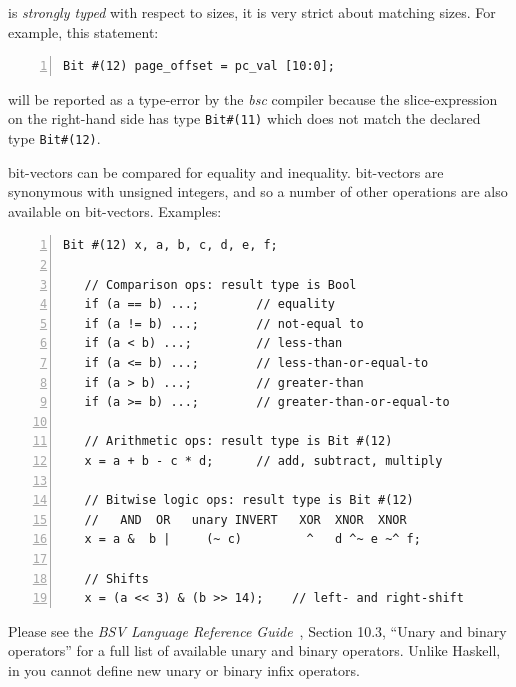 {\BSV} is \emph{strongly typed} with respect to sizes, {\ie} it is very
strict about matching sizes.  For example, this statement:

{\footnotesize
\begin{Verbatim}[frame=single, numbers=left]
   Bit #(12) page_offset = pc_val [10:0];
\end{Verbatim}
}

will be reported as a type-error by the \emph{bsc} compiler because
the slice-expression on the right-hand side has type \verb|Bit#(11)|
which does not match the declared type \verb|Bit#(12)|.




{\BSV} bit-vectors can be compared for equality and inequality.  {\BSV}
bit-vectors are synonymous with unsigned integers, and so a number of
other operations are also available on bit-vectors.  Examples:


{\footnotesize
\begin{Verbatim}[frame=single, numbers=left]
   Bit #(12) x, a, b, c, d, e, f;

   // Comparison ops: result type is Bool
   if (a == b) ...;        // equality
   if (a != b) ...;        // not-equal to
   if (a < b) ...;         // less-than
   if (a <= b) ...;        // less-than-or-equal-to
   if (a > b) ...;         // greater-than
   if (a >= b) ...;        // greater-than-or-equal-to

   // Arithmetic ops: result type is Bit #(12)
   x = a + b - c * d;      // add, subtract, multiply

   // Bitwise logic ops: result type is Bit #(12)
   //   AND  OR   unary INVERT   XOR  XNOR  XNOR
   x = a &  b |     (~ c)         ^   d ^~ e ~^ f;

   // Shifts
   x = (a << 3) & (b >> 14);    // left- and right-shift
\end{Verbatim}
}

Please see the \emph{BSV Language Reference Guide}~\cite{BLang2000},
Section 10.3, ``Unary and binary operators'' for a full list of
available unary and binary operators.  Unlike Haskell, in {\BSV} you
cannot define new unary or binary infix operators.

